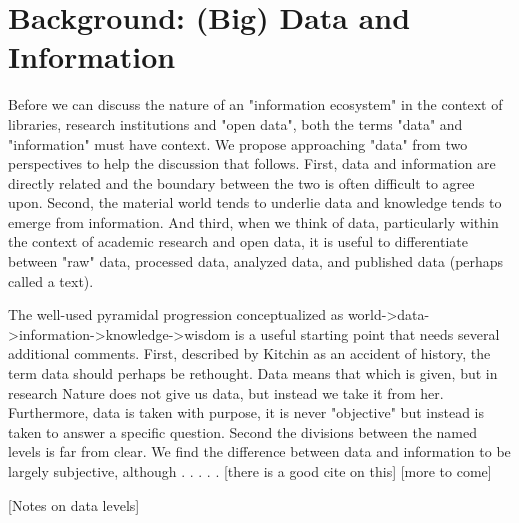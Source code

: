\section{Background: (Big) Data and Information}

Before we can discuss the nature of an "information ecosystem" in the context of libraries, research institutions and "open data", both the terms "data" and "information" must have context. We propose approaching "data" from two perspectives to help the discussion that follows. First, data and information are directly related and the boundary between the two is often difficult to agree upon. Second, the material world tends to underlie data and knowledge tends to emerge from information. And third, when we think of data, particularly within the context of academic research and open data, it is useful to differentiate between "raw" data, processed data, analyzed data, and published data (perhaps called a text). 

The well-used pyramidal progression conceptualized as world->data->information->knowledge->wisdom is a useful starting point that needs several additional comments. First, described by Kitchin as an accident of history, the term data should perhaps be rethought. Data means that which is given, but in research Nature does not give us data, but instead we take it from her. Furthermore, data is taken with purpose, it is never "objective" but instead is taken to answer a specific question. Second the divisions between the named levels is far from clear. We find the difference between data and information to be largely subjective, although  . . . . . [there is a good cite on this] [more to come]

[Notes on data levels]